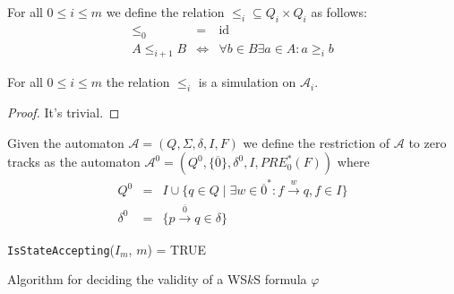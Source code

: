 \begin{defz}
 For all $0 \leq i \leq m$ we define the relation $\leq_i \subseteq Q_i \times
 Q_i$ as follows:
 \begin{eqnarray}
  \leq_0 & = & \text{id}\\
  A \leq_{i+1} B & \Leftrightarrow & \forall b \in B \exists a \in A: a \geq_i
  b
 \end{eqnarray}
\end{defz}

\begin{lemma}
 For all $0 \leq i \leq m$ the relation $\leq_i$ is a simulation on
 $\mathcal{A}_i$.
\end{lemma}
\begin{proof}
 {\color{red} It's trivial.}
\end{proof}

% 

\begin{defz}
Given the automaton $\mathcal{A} = (Q, \Sigma, \delta, I, F)$ we define the
restriction of $\mathcal{A}$ to zero tracks as
the automaton $\mathcal{A}^0 = (Q^0, \{\overline{0}\}, \delta^0, I, PRE_0^*(F))$
where
\begin{eqnarray}
 Q^0 & = & I \cup \{q \in Q \mid \exists w \in \overline{0}^*: f
 \overset{w}{\longrightarrow} q, f \in I\}\\
 \delta^0 & = & \{p \overset{\overline{0}}{\longrightarrow} q \in \delta\}
\end{eqnarray}
\end{defz}

\begin{algorithm}[ht!]
		\BlankLine
		\nl \Return \texttt{IsStateAccepting}($I_m$, $m$) = \textsc{TRUE}
		\BlankLine
		\caption{Algorithm for deciding the validity of a WS$k$S
		formula $\varphi$}\label{deciding-wsks-alg}
	\end{algorithm}

